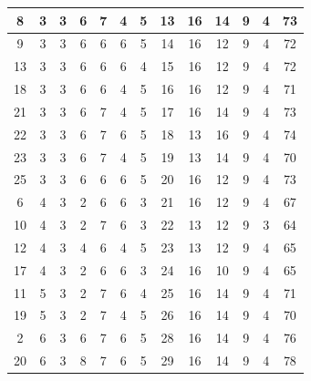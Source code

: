 \documentclass[UTF8]{ctexart}
\begin{document}
\begin{itemize}
\begin{table}[!ht]
{{\begin{tabular}{|c|c|c|c|c|c|c|c|c|c|c|c|c|}
						8      & 3        & 3      & 6    & 7        & 4        & 5          & 13         & 16       & 14       & 9             & 4          & 73   \\ \hline
						9      & 3        & 3      & 6    & 6        & 6        & 5          & 14         & 16       & 12       & 9             & 4          & 72   \\ \hline
						13     & 3        & 3      & 6    & 6        & 6        & 4          & 15         & 16       & 12       & 9             & 4          & 72   \\ \hline
						18     & 3        & 3      & 6    & 6        & 4        & 5          & 16         & 16       & 12       & 9             & 4          & 71   \\ \hline
						21     & 3        & 3      & 6    & 7        & 4        & 5          & 17         & 16       & 14       & 9             & 4          & 73   \\ \hline
						22     & 3        & 3      & 6    & 7        & 6        & 5          & 18         & 13       & 16       & 9             & 4          & 74   \\ \hline
						23     & 3        & 3      & 6    & 7        & 4        & 5          & 19         & 13       & 14       & 9             & 4          & 70   \\ \hline
						25     & 3        & 3      & 6    & 6        & 6        & 5          & 20         & 16       & 12       & 9             & 4          & 73   \\ \hline
						6      & 4        & 3      & 2    & 6        & 6        & 3          & 21         & 16       & 12       & 9             & 4          & 67   \\ \hline
						10     & 4        & 3      & 2    & 7        & 6        & 3          & 22         & 13       & 12       & 9             & 3          & 64   \\ \hline
						12     & 4        & 3      & 4    & 6        & 4        & 5          & 23         & 13       & 12       & 9             & 4          & 65   \\ \hline
						17     & 4        & 3      & 2    & 6        & 6        & 3          & 24         & 16       & 10       & 9             & 4          & 65   \\ \hline
						11     & 5        & 3      & 2    & 7        & 6        & 4          & 25         & 16       & 14       & 9             & 4          & 71   \\ \hline
						19     & 5        & 3      & 2    & 7        & 4        & 5          & 26         & 16       & 14       & 9             & 4          & 70   \\ \hline
						2      & 6        & 3      & 6    & 7        & 6        & 5          & 28         & 16       & 14       & 9             & 4          & 76   \\ \hline
						20     & 6        & 3      & 8    & 7        & 6        & 5          & 29         & 16       & 14       & 9             & 4          & 78   \\ \hline
					\end{tabular}
				}
			}
		\end{table}


\end{itemize}
\end{document}
